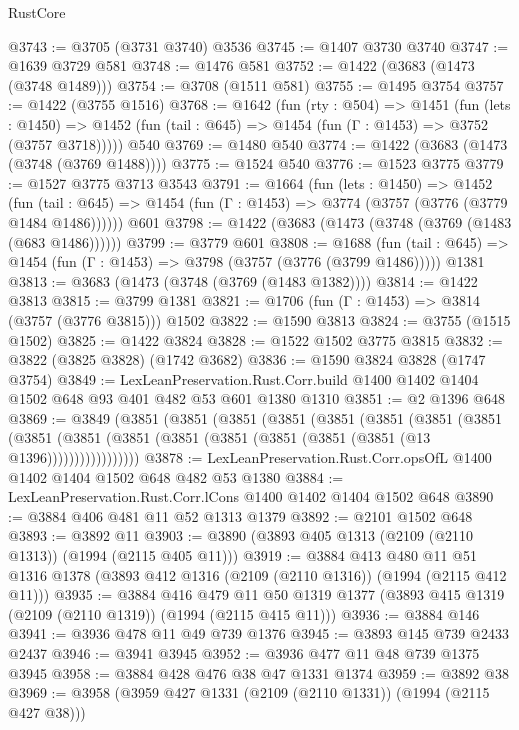 \begin{lexlean}{RustCore}
\begin{coremodule}
@3743 := @3705 (@3731 @3740) @3536
@3745 := @1407 @3730 @3740
@3747 := @1639 @3729 @581
@3748 := @1476 @581
@3752 := @1422 (@3683 (@1473 (@3748 @1489)))
@3754 := @3708 (@1511 @581)
@3755 := @1495 @3754
@3757 := @1422 (@3755 @1516)
@3768 := @1642
    (fun (rty : @504) =>
    @1451
      (fun (lets : @1450) =>
      @1452 (fun (tail : @645) => @1454 (fun (Γ : @1453) => @3752 (@3757 @3718)))))
    @540
@3769 := @1480 @540
@3774 := @1422 (@3683 (@1473 (@3748 (@3769 @1488))))
@3775 := @1524 @540
@3776 := @1523 @3775
@3779 := @1527 @3775 @3713 @3543
@3791 := @1664
    (fun (lets : @1450) =>
    @1452
      (fun (tail : @645) => @1454 (fun (Γ : @1453) => @3774 (@3757 (@3776 (@3779 @1484 @1486))))))
    @601
@3798 := @1422 (@3683 (@1473 (@3748 (@3769 (@1483 (@683 @1486))))))
@3799 := @3779 @601
@3808 := @1688
    (fun (tail : @645) => @1454 (fun (Γ : @1453) => @3798 (@3757 (@3776 (@3799 @1486)))))
    @1381
@3813 := @3683 (@1473 (@3748 (@3769 (@1483 @1382))))
@3814 := @1422 @3813
@3815 := @3799 @1381
@3821 := @1706 (fun (Γ : @1453) => @3814 (@3757 (@3776 @3815))) @1502
@3822 := @1590 @3813
@3824 := @3755 (@1515 @1502)
@3825 := @1422 @3824
@3828 := @1522 @1502 @3775 @3815
@3832 := @3822 (@3825 @3828) (@1742 @3682)
@3836 := @1590 @3824 @3828 (@1747 @3754)
@3849 := LexLeanPreservation.Rust.Corr.build
    @1400
    @1402
    @1404
    @1502
    @648
    @93
    @401
    @482
    @53
    @601
    @1380
    @1310
@3851 := @2 @1396 @648
@3869 := @3849
    (@3851
      (@3851
        (@3851
          (@3851
            (@3851
              (@3851
                (@3851
                  (@3851
                    (@3851
                      (@3851 (@3851 (@3851 (@3851 (@3851 (@3851 (@3851 (@13 @1396)))))))))))))))))
@3878 := LexLeanPreservation.Rust.Corr.opsOfL @1400 @1402 @1404 @1502 @648 @482 @53 @1380
@3884 := LexLeanPreservation.Rust.Corr.lCons @1400 @1402 @1404 @1502 @648
@3890 := @3884 @406 @481 @11 @52 @1313 @1379
@3892 := @2101 @1502 @648
@3893 := @3892 @11
@3903 := @3890 (@3893 @405 @1313 (@2109 (@2110 @1313)) (@1994 (@2115 @405 @11)))
@3919 := @3884
    @413
    @480
    @11
    @51
    @1316
    @1378
    (@3893 @412 @1316 (@2109 (@2110 @1316)) (@1994 (@2115 @412 @11)))
@3935 := @3884
    @416
    @479
    @11
    @50
    @1319
    @1377
    (@3893 @415 @1319 (@2109 (@2110 @1319)) (@1994 (@2115 @415 @11)))
@3936 := @3884 @146
@3941 := @3936 @478 @11 @49 @739 @1376
@3945 := @3893 @145 @739 @2433 @2437
@3946 := @3941 @3945
@3952 := @3936 @477 @11 @48 @739 @1375 @3945
@3958 := @3884 @428 @476 @38 @47 @1331 @1374
@3959 := @3892 @38
@3969 := @3958 (@3959 @427 @1331 (@2109 (@2110 @1331)) (@1994 (@2115 @427 @38)))

\end{coremodule}
\end{lexlean}
